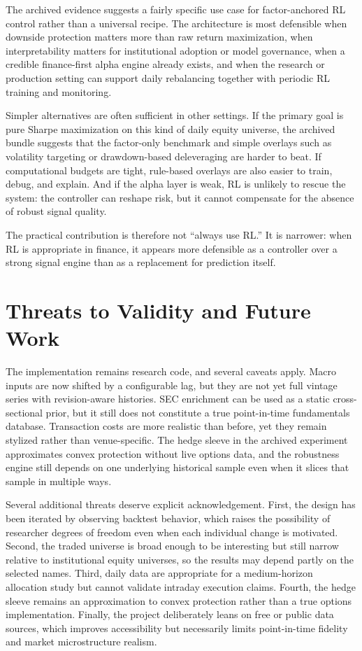 \documentclass[11pt]{article}
\begin{document}
The archived evidence suggests a fairly specific use case for factor-anchored RL
control rather than a universal recipe. The architecture is most defensible when
downside protection matters more than raw return maximization, when
interpretability matters for institutional adoption or model governance, when a
credible finance-first alpha engine already exists, and when the research or
production setting can support daily rebalancing together with periodic RL
training and monitoring.

Simpler alternatives are often sufficient in other settings. If the primary goal
is pure Sharpe maximization on this kind of daily equity universe, the archived
bundle suggests that the factor-only benchmark and simple overlays such as
volatility targeting or drawdown-based deleveraging are harder to beat. If
computational budgets are tight, rule-based overlays are also easier to train,
debug, and explain. And if the alpha layer is weak, RL is unlikely to rescue the
system: the controller can reshape risk, but it cannot compensate for the
absence of robust signal quality.

The practical contribution is therefore not ``always use RL.'' It is narrower:
when RL is appropriate in finance, it appears more defensible as a controller
over a strong signal engine than as a replacement for prediction itself.

\section{Threats to Validity and Future Work}

The implementation remains research code, and several caveats apply. Macro inputs
are now shifted by a configurable lag, but they are not yet full vintage series
with revision-aware histories. SEC enrichment can be used as a static
cross-sectional prior, but it still does not constitute a true point-in-time
fundamentals database. Transaction costs are more realistic than before, yet
they remain stylized rather than venue-specific. The hedge sleeve in the
archived experiment approximates convex protection without live options data,
and the robustness engine still depends on one underlying historical sample even
when it slices that sample in
multiple ways.

Several additional threats deserve explicit acknowledgement. First, the design
has been iterated by observing backtest behavior, which raises the possibility
of researcher degrees of freedom even when each individual change is motivated.
Second, the traded universe is broad enough to be interesting but still narrow
relative to institutional equity universes, so the results may depend partly on
the selected names. Third, daily data are appropriate for a medium-horizon
allocation study but cannot validate intraday execution claims. Fourth, the
hedge sleeve remains an approximation to convex protection rather than a true
options implementation. Finally, the project deliberately leans on free or
public data sources, which improves accessibility but necessarily limits
point-in-time fidelity and market microstructure realism.
\end{document}
